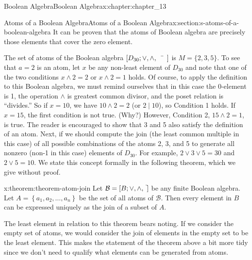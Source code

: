 \documentclass[twoside,10pt,]{book}
\numberwithin{equation}{section}
\begin{document}
\begin{chapterptx}{Boolean Algebra}{}{Boolean Algebra}{}{}{x:chapter:chapter_13}
\begin{sectionptx}{Atoms of a Boolean Algebra}{}{Atoms of a Boolean Algebra}{}{}{x:section:s-atoms-of-a-boolean-algebra}
It can be proven that the atoms of Boolean algebra are precisely those elements that cover the zero element.%
\par
The set of atoms of the Boolean algebra \(\left[D_{30}; \lor , \land, \bar{\hspace{5 mm}}\right]\) is \(M = \{2, 3, 5\}\). To see that \(a = 2\) is an atom, let \(x\) be any non-least element of \(D_{30}\) and note that one of the two conditions \(x \land  2 = 2\) or \(x \land
2 = 1\) holds. Of course, to apply the definition to this Boolean algebra, we must remind ourselves that in this case the 0-element is 1, the operation \(\land\) is greatest common divisor, and the poset relation is ``divides.'' So if \(x = 10\), we have \(10 \land  2 = 2\) (or \(2 \mid 10\)), so Condition 1 holds. If \(x = 15\), the first condition is not true. (Why?) However, Condition 2, \(15 \land  2 = 1\), is true. The reader is encouraged to show that 3 and 5 also satisfy the definition of an atom. Next, if we should compute the join (the least common multiple in this case) of all possible combinations of the atoms 2, 3, and 5 to generate all nonzero (non-1 in this case) elements of \(D_{30}\). For example, \(2 \lor  3 \lor  5 = 30\) and \(2 \lor  5 = 10\). We state this concept formally in the following theorem, which we give without proof.%
\begin{theorem}{}{}{x:theorem:theorem-atom-join}%
Let \(\mathcal{B}=[B; \lor, \land, \hspace{1 mm}^{\bar{}}] \) be any finite Boolean algebra. Let  \(A = \left\{a_1, a_2, \dots ,a_n\right\}\) be the set of all atoms of \(\mathcal{B}\). Then every element in \(B\) can be expressed uniquely as the join of a subset of \(A\).%
\end{theorem}
The least element in relation to this theorem bears noting.  If we consider the empty set of atoms, we would consider the join of elements in the empty set to be the least element. This makes the statement of the theorem above a bit more tidy since we don't need to qualify what elements can be generated from atoms.%
\par

\end{sectionptx}
\end{chapterptx}
\end{document}
